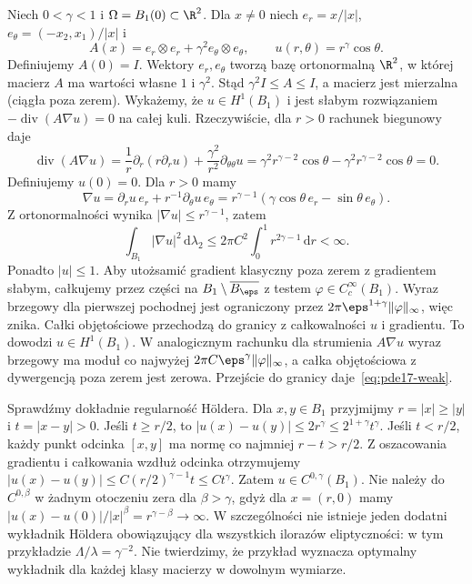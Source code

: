 \begin{kontrprzyklad}
\label{ex:pde17-radial}
Niech $0<\gamma<1$ i $\Omega=B_1(0)\subset\R^2$. Dla $x\ne0$
niech $e_r=x/|x|$, $e_\theta=(-x_2,x_1)/|x|$ i
\[
 A(x)=e_r\otimes e_r+\gamma^2 e_\theta\otimes e_\theta,
 \qquad u(r,\theta)=r^\gamma\cos\theta.
\]
Definiujemy $A(0)=I$. Wektory $e_r,e_\theta$ tworzą
bazę ortonormalną $\R^2$, w której macierz $A$ ma wartości
własne $1$ i $\gamma^2$. Stąd $\gamma^2I\le A\le I$,
a macierz jest mierzalna (ciągła poza zerem).
Wykażemy, że $u\in H^1(B_1)$ i jest słabym rozwiązaniem
$-\operatorname{div}(A\nabla u)=0$ na całej kuli.
Rzeczywiście, dla $r>0$ rachunek biegunowy daje
\[
 \operatorname{div}(A\nabla u)=
 \frac1r\partial_r(r\partial_ru)
 +\frac{\gamma^2}{r^2}\partial_{\theta\theta}u
 =\gamma^2r^{\gamma-2}\cos\theta
 -\gamma^2r^{\gamma-2}\cos\theta=0.
\]
Definiujemy $u(0)=0$. Dla $r>0$ mamy
\[
 \nabla u=\partial_r u\,e_r+r^{-1}\partial_\theta u\,e_\theta
 =r^{\gamma-1}(\gamma\cos\theta\,e_r-\sin\theta\,e_\theta).
\]
Z ortonormalności wynika $|\nabla u|\le r^{\gamma-1}$,
zatem
\[
 \int_{B_1}|\nabla u|^2\,\mathrm d\lambda_2
 \le 2\pi C^2\int_0^1 r^{2\gamma-1}\,\mathrm dr<\infty.
\]
Ponadto $|u|\le1$. Aby utożsamić gradient klasyczny poza
zerem z gradientem słabym, całkujemy przez części na
$B_1\setminus\overline{B_\eps}$ z testem
$\varphi\in C_c^\infty(B_1)$. Wyraz brzegowy
dla pierwszej pochodnej jest ograniczony przez
$2\pi\eps^{1+\gamma}\|\varphi\|_\infty$, więc znika.
Całki objętościowe przechodzą do granicy z całkowalności
$u$ i gradientu. To dowodzi $u\in H^1(B_1)$.
W analogicznym rachunku dla strumienia $A\nabla u$
wyraz brzegowy ma moduł co najwyżej
$2\pi C\eps^\gamma\|\varphi\|_\infty$, a całka
objętościowa z dywergencją poza zerem jest zerowa.
Przejście do granicy daje~\eqref{eq:pde17-weak}.

Sprawdźmy dokładnie regularność Höldera. Dla
$x,y\in B_1$ przyjmijmy $r=|x|\ge|y|$ i $t=|x-y|>0$.
Jeśli $t\ge r/2$, to
$|u(x)-u(y)|\le2r^\gamma\le 2^{1+\gamma}t^\gamma$.
Jeśli $t<r/2$, każdy punkt odcinka $[x,y]$
ma normę co najmniej $r-t>r/2$. Z oszacowania
gradientu i całkowania wzdłuż odcinka otrzymujemy
$|u(x)-u(y)|\le C (r/2)^{\gamma-1}t\le C t^\gamma$.
Zatem $u\in C^{0,\gamma}(B_1)$.
Nie należy do $C^{0,\beta}$ w żadnym otoczeniu zera
dla $\beta>\gamma$, gdyż dla $x=(r,0)$ mamy
$|u(x)-u(0)|/|x|^\beta=r^{\gamma-\beta}\to\infty$.
W szczególności nie istnieje jeden dodatni wykładnik
Höldera obowiązujący dla wszystkich ilorazów
eliptyczności: w tym przykładzie $\Lambda/\lambda=\gamma^{-2}$.
Nie twierdzimy, że przykład wyznacza optymalny wykładnik
dla każdej klasy macierzy w dowolnym wymiarze.
\end{kontrprzyklad}

